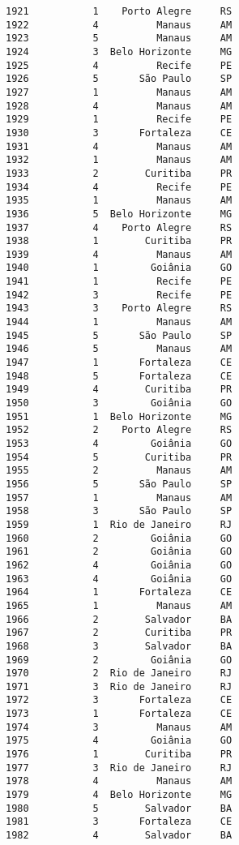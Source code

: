 \documentclass[11pt]{article}
\begin{document}
\begin{Verbatim}[commandchars=\\\{\}]
1921           1    Porto Alegre     RS  
1922           4          Manaus     AM  
1923           5          Manaus     AM  
1924           3  Belo Horizonte     MG  
1925           4          Recife     PE  
1926           5       São Paulo     SP  
1927           1          Manaus     AM  
1928           4          Manaus     AM  
1929           1          Recife     PE  
1930           3       Fortaleza     CE  
1931           4          Manaus     AM  
1932           1          Manaus     AM  
1933           2        Curitiba     PR  
1934           4          Recife     PE  
1935           1          Manaus     AM  
1936           5  Belo Horizonte     MG  
1937           4    Porto Alegre     RS  
1938           1        Curitiba     PR  
1939           4          Manaus     AM  
1940           1         Goiânia     GO  
1941           1          Recife     PE  
1942           3          Recife     PE  
1943           3    Porto Alegre     RS  
1944           1          Manaus     AM  
1945           5       São Paulo     SP  
1946           5          Manaus     AM  
1947           1       Fortaleza     CE  
1948           5       Fortaleza     CE  
1949           4        Curitiba     PR  
1950           3         Goiânia     GO  
1951           1  Belo Horizonte     MG  
1952           2    Porto Alegre     RS  
1953           4         Goiânia     GO  
1954           5        Curitiba     PR  
1955           2          Manaus     AM  
1956           5       São Paulo     SP  
1957           1          Manaus     AM  
1958           3       São Paulo     SP  
1959           1  Rio de Janeiro     RJ  
1960           2         Goiânia     GO  
1961           2         Goiânia     GO  
1962           4         Goiânia     GO  
1963           4         Goiânia     GO  
1964           1       Fortaleza     CE  
1965           1          Manaus     AM  
1966           2        Salvador     BA  
1967           2        Curitiba     PR  
1968           3        Salvador     BA  
1969           2         Goiânia     GO  
1970           2  Rio de Janeiro     RJ  
1971           3  Rio de Janeiro     RJ  
1972           3       Fortaleza     CE  
1973           1       Fortaleza     CE  
1974           3          Manaus     AM  
1975           4         Goiânia     GO  
1976           1        Curitiba     PR  
1977           3  Rio de Janeiro     RJ  
1978           4          Manaus     AM  
1979           4  Belo Horizonte     MG  
1980           5        Salvador     BA  
1981           3       Fortaleza     CE  
1982           4        Salvador     BA  

\end{Verbatim}
\end{document}
